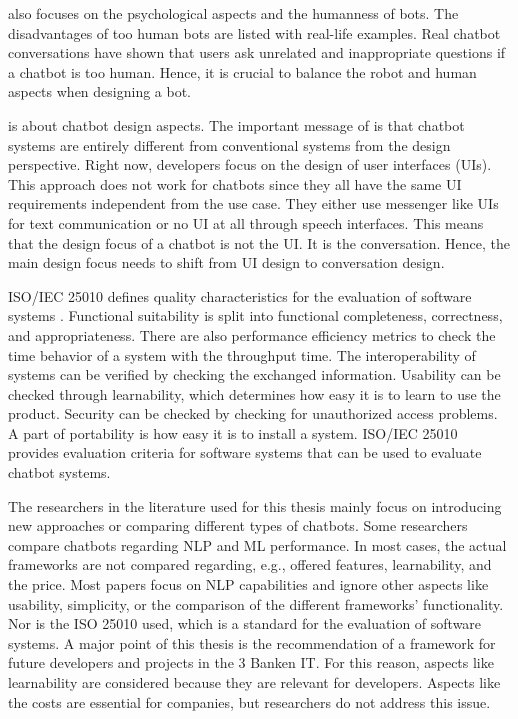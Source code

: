 \citet{brandtzaeg2018chatbots} also focuses on the psychological aspects and the humanness of bots.
The disadvantages of too human bots are listed with real-life examples. 
Real chatbot conversations have shown that users ask unrelated and inappropriate questions if a chatbot is too human. 
Hence, it is crucial to balance the robot and human aspects when designing a bot.

\citet{dutta2017developing} is about chatbot design aspects.
The important message of \citet{dutta2017developing} is that chatbot systems are entirely different from conventional systems from the design perspective.
Right now, developers focus on the design of user interfaces (UIs).
This approach does not work for chatbots since they all have the same UI requirements independent from the use case.
They either use messenger like UIs for text communication or no UI at all through speech interfaces.
This means that the design focus of a chatbot is not the UI.
It is the conversation.
Hence, the main design focus needs to shift from UI design to conversation design.




ISO/IEC 25010 defines quality characteristics for the evaluation of software systems \cite{iso25010}.
Functional suitability is split into functional completeness, correctness, and appropriateness.
There are also performance efficiency metrics to check the time behavior of a system with the throughput time.
The interoperability of systems can be verified by checking the exchanged information.
Usability can be checked through learnability, which determines how easy it is to learn to use the product.
Security can be checked by checking for unauthorized access problems.
A part of portability is how easy it is to install a system.
ISO/IEC 25010 provides evaluation criteria for software systems that can be used to evaluate chatbot systems.


The researchers in the literature used for this thesis mainly focus on introducing new approaches or comparing different types of chatbots.
Some researchers compare chatbots regarding NLP and ML performance.
In most cases, the actual frameworks are not compared regarding, e.g., offered features, learnability, and the price.
Most papers focus on NLP capabilities and ignore other aspects like usability, simplicity, or the comparison of the different frameworks' functionality.
Nor is the ISO 25010\cite{iso25010} used, which is a standard for the evaluation of software systems.
A major point of this thesis is the recommendation of a framework for future developers and projects in the 3 Banken IT.
For this reason, aspects like learnability are considered because they are relevant for developers.
Aspects like the costs are essential for companies, but researchers do not address this issue.

